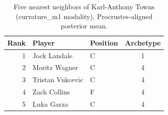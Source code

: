 \begin{table}[htbp]
  \centering\small
  \begin{tabular}{rllc}
    \toprule
    Rank & Player & Position & Archetype \\
    \midrule
    1 & Jock Landale & C & 1 \\
    2 & Moritz Wagner & C & 4 \\
    3 & Tristan Vukcevic & C & 4 \\
    4 & Zach Collins & F & 4 \\
    5 & Luka Garza & C & 4 \\
    \bottomrule
  \end{tabular}
  \caption{Five nearest neighbors of Karl-Anthony Towns (curvature_m1 modality), Procrustes-aligned posterior mean.}
  \label{tab:Karl_Anthony_Towns_neighbors_curvature_m1}
\end{table}

